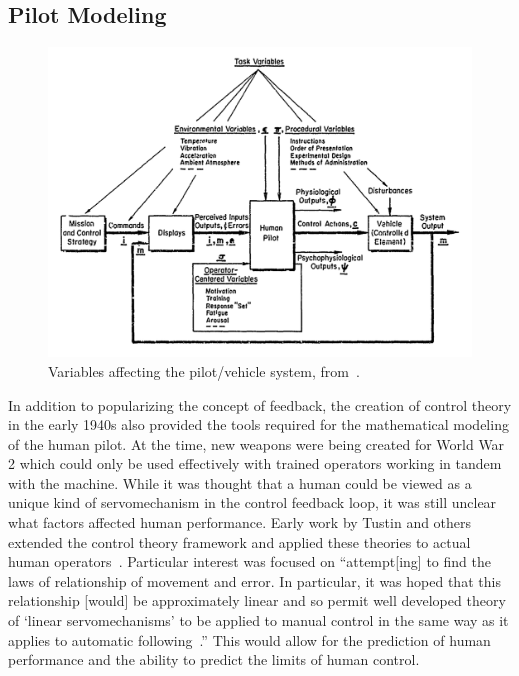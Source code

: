 \documentclass[float=false, crop=false]{standalone}
\begin{document}
\subsection{Pilot Modeling}
\begin{figure}[tb]
    \begin{center}
        \includegraphics[width=0.8\linewidth]{./../img/Screen Shot 2018-07-25 at 10.37.08 AM.png}
        \caption{Variables affecting the pilot/vehicle system, from~\cite{McRuer1974}.}
        \label{figure:mcruer1974}
    \end{center}
\end{figure}

In addition to popularizing the concept of feedback, the creation of control theory in the early 1940s also provided the tools required for the mathematical modeling of the human pilot.
At the time, new weapons were being created for World War 2 which could only be used effectively with trained operators working in tandem with the machine.
While it was thought that a human could be viewed as a unique kind of servomechanism in the control feedback loop, it was still unclear what factors affected human performance.
Early work by Tustin and others extended the control theory framework and applied these theories to actual human operators~\cite{tustininvestigation}.
Particular interest was focused on ``attempt[ing] to find the laws of relationship of movement and error. In particular, it was hoped that this relationship [would] be approximately linear and so permit well developed theory of `linear servomechanisms' to be applied to manual control in the same way as it applies to automatic following~\cite{tustininvestigation}.''
This would allow for the prediction of human performance and the ability to predict the limits of human control.
\end{document}

